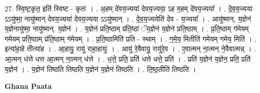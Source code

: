 \documentclass[17pt]{extarticle}
\begin{document}
27. स्वि॒ष्ट॒कृत॒ इति॑ स्विष्ट - कृतः॑ । . अ॒हम् दे॑वय॒ज्यया॑ देवय॒ज्यया॒ ऽह म॒हम् दे॑वय॒ज्यया᳚ । . दे॒व॒य॒ज्यया ऽऽयु॑ष्मा॒ नायु॑ष्मान् देवय॒ज्यया॑ देवय॒ज्यया ऽऽयु॑ष्मान् । . दे॒व॒य॒ज्ययेति॑ देव - य॒ज्यया᳚ । . आयु॑ष्मान्. य॒ज्ञेन॑ य॒ज्ञेनायु॑ष्मा॒ नायु॑ष्मान्. य॒ज्ञेन॑ । . य॒ज्ञेन॑ प्रति॒ष्ठाम् प्र॑ति॒ष्ठां ॅय॒ज्ञेन॑ य॒ज्ञेन॑ प्रति॒ष्ठाम् । . प्र॒ति॒ष्ठाम् ग॑मेयम् गमेयम् प्रति॒ष्ठाम् प्र॑ति॒ष्ठाम् ग॑मेयम् । . प्र॒ति॒ष्ठामिति॑ प्रति - स्थाम् । . ग॒मे॒य॒ मितीति॑ गमेयम् गमेय॒ मिति॑ । . इत्या॑हा॒हे तीत्या॑ह । . आ॒हायु॒ रायु॑ राहा॒हायुः॑ । . आयु॑ रे॒वैवायु॒ रायु॑रे॒व । . ए॒वात्मन् ना॒त्मन् ने॒वैवात्मन्न् । . आ॒त्मन् ध॑त्ते धत्त आ॒त्मन् ना॒त्मन् ध॑त्ते । . ध॒त्ते॒ प्रति॒ प्रति॑ धत्ते धत्ते॒ प्रति॑ । . प्रति॑ य॒ज्ञेन॑ य॒ज्ञेन॒ प्रति॒ प्रति॑ य॒ज्ञेन॑ । . य॒ज्ञेन॑ तिष्ठति तिष्ठति य॒ज्ञेन॑ य॒ज्ञेन॑ तिष्ठति । . ति॒ष्ठ॒तीति॑ तिष्ठति । \newline

\textbf{Ghana Paata } \newline
\end{document}
